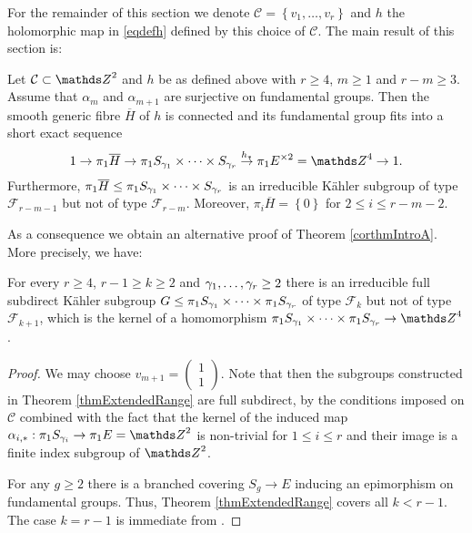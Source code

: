 For the remainder of this section we denote $\mathcal{C}=\left\{v_1,\dots,v_r\right\}$ and $h$ the holomorphic map in \eqref{eqdefh} defined by this choice of $\mathcal{C}$. The main result of this section is:

\begin{theorem}
 Let $\mathcal{C} \subset \ZZ^2$ and $h$ be as defined above with $r\geq 4$, $m\geq 1$ and $r-m\geq 3$. Assume that $\alpha_m$ and $\alpha_{m+1}$ are surjective on fundamental groups. Then the smooth generic fibre $\overline{H}$ of $h$ is connected and its fundamental group fits into a short exact sequence
 \[
  1\to \pi_1 \overline{H} \to \pi_1 S_{\g_1}\times \dots \times S_{\g_r}\stackrel{h_{\ast}}{\to} \pi_1 E^{\times 2} = \ZZ^4 \to 1.
 \]
 Furthermore, $\pi_1 \overline{H}\leq \pi_1 S_{\gamma_1}\times \dots \times S_{\gamma_r}$ is an irreducible K\"ahler subgroup of type $\mathcal{F}_{r-m-1}$ but not of type $\mathcal{F}_{r-m}$. Moreover, $\pi_i \overline{H} =\left\{0\right\}$ for $2\leq i \leq r-m-2$.
 \label{thmExtendedRange}
\end{theorem}


As a consequence we obtain an alternative proof of Theorem \ref{corthmIntroA}. More precisely, we have:
\begin{corollary}
 For every $r\geq 4$, $r-1\geq k\geq 2$ and $\gamma_1,\dots,\gamma_r\geq 2$ there is an irreducible full subdirect K\"ahler subgroup $G\leq \pi_1 S_{\gamma_1}\times \dots \times \pi_1 S_{\gamma_r}$ of type $\mathcal{F}_k$ but not of type $\mathcal{F}_{k+1}$, which is the kernel of a homomorphism $\pi_1 S_{\g_1}\times \dots \times \pi_1 S_{\g_r}\to \ZZ^4$.
 \label{corExtendedRange}
\end{corollary}
\begin{proof}
We may choose $v_{m+1}=\left(\begin{array}{c}1\\1 \end{array}\right)$. Note that then the subgroups constructed in Theorem \ref{thmExtendedRange} are full subdirect, by the conditions imposed on $\mathcal{C}$ combined with the fact that the kernel of the induced map $\alpha_{i,\ast}: \pi_1 S_{\g_i} \to \pi_1 E = \ZZ^2$ is non-trivial for $1\leq i \leq r$ and their image is a finite index subgroup of $\ZZ^2$. 

For any $g\geq 2$ there is a branched covering $S_g\to E$ inducing an epimorphism on fundamental groups. Thus, Theorem \ref{thmExtendedRange} covers all $k<r-1$. The case $k=r-1$ is immediate from \cite[Theorem 1.1]{Llo-16-II}. 
\end{proof}

